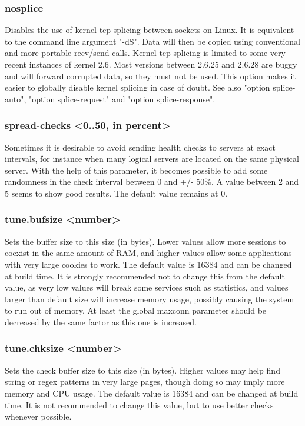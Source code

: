 \subsubsection[nosplice]{nosplice}
  Disables the use of kernel tcp splicing between sockets on Linux. It is
  equivalent to the command line argument "-dS".  Data will then be copied
  using conventional and more portable recv/send calls. Kernel tcp splicing is
  limited to some very recent instances of kernel 2.6. Most versions between
  2.6.25 and 2.6.28 are buggy and will forward corrupted data, so they must not
  be used. This option makes it easier to globally disable kernel splicing in
  case of doubt. See also "option splice-auto", "option splice-request" and
  "option splice-response".

\subsubsection[spread-checks]{spread-checks <0..50, in percent>}
  Sometimes it is desirable to avoid sending health checks to servers at exact
  intervals, for instance when many logical servers are located on the same
  physical server. With the help of this parameter, it becomes possible to add
  some randomness in the check interval between 0 and +/- 50\%. A value between
  2 and 5 seems to show good results. The default value remains at 0.

\subsubsection[tune.bufsize]{tune.bufsize <number>}
  Sets the buffer size to this size (in bytes). Lower values allow more
  sessions to coexist in the same amount of RAM, and higher values allow some
  applications with very large cookies to work. The default value is 16384 and
  can be changed at build time. It is strongly recommended not to change this
  from the default value, as very low values will break some services such as
  statistics, and values larger than default size will increase memory usage,
  possibly causing the system to run out of memory. At least the global maxconn
  parameter should be decreased by the same factor as this one is increased.

\subsubsection[tune.chksize]{tune.chksize <number>}
  Sets the check buffer size to this size (in bytes). Higher values may help
  find string or regex patterns in very large pages, though doing so may imply
  more memory and CPU usage. The default value is 16384 and can be changed at
  build time. It is not recommended to change this value, but to use better
  checks whenever possible.

